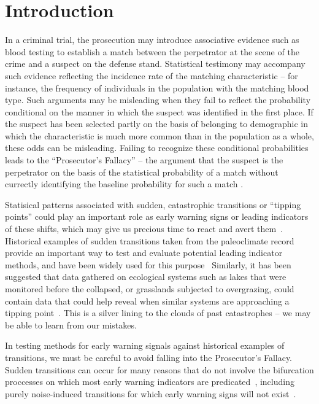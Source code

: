 \documentclass[authoryear,review,12pt]{elsarticle}
\begin{document}
\section{Introduction}
In a criminal trial, the prosecution may introduce associative evidence such as 
blood testing to establish a match between the perpetrator at the scene of the
crime and a suspect on the defense stand.  Statistical testimony may accompany 
such evidence reflecting the incidence rate of the matching characteristic -- 
for instance, the frequency of individuals in the population with the matching
blood type.  Such arguments may be misleading when they fail to reflect the 
probability conditional on the manner in which the suspect was identified in 
the first place.  If the suspect has been selected partly on the basis of belonging
to demographic in which the characteristic is much more common than in the 
population as a whole, these odds can be misleading.  Failing to recognize 
these conditional probabilities leads to the ``Prosecutor's Fallacy'' -- the argument
that the suspect is the perpetrator on the basis of the statistical probability 
of a match without currectly identifying the baseline probability for such a match
\citep{Thompson1987}.

Statisical patterns associated with sudden, catastrophic transitions or ``tipping points''
could play an important role as early warning signs or leading indicators of
these shifts, which may give us precious time to react and avert them~\citep{Scheffer2009, Lenton2011}.
Historical examples of sudden transitions taken from the paleoclimate record
provide an important way to test and evaluate potential leading indicator methods,
and have been widely used for this purpose~\citep{Livina2007,Dakos2008,Lenton2012,Ditlevsen2010,Guttal2008,Thompson2010} 
Similarly, it has been suggested that data gathered on ecological systems such as lakes
that were monitored before the collapsed, or grasslands subjected to overgrazing,
could contain data that could help reveal when similar systems are approaching 
a tipping point~\citet{Inman2011}.  This is a silver lining to the clouds of past
catastrophes -- we may be able to learn from our mistakes. 

In testing methods for early warning signals against historical examples of transitions,
we must be careful to avoid falling into the Prosecutor's Fallacy.  Sudden transitions
can occur for many reasons that do not involve the bifurcation proccesses on which
most early warning indicators are predicated~\citep{Hastings2010}, including purely
noise-induced transitions for which early warning signs will not exist~\citep{Ditlevsen2010, Lenton2011}.
\end{document}
